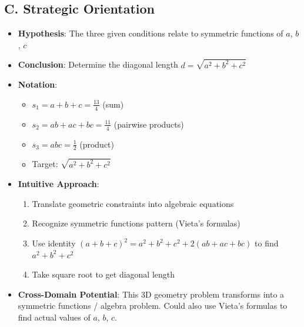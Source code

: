 \documentclass[12pt]{article}
\begin{document}
\begin{problemconfigbox}
\subsection*{C. Strategic Orientation}
\begin{itemize}[leftmargin=*]
    \item \textbf{Hypothesis}: The three given conditions relate to symmetric functions of $a$, $b$, $c$
    \item \textbf{Conclusion}: Determine the diagonal length $d = \sqrt{a^2 + b^2 + c^2}$
    \item \textbf{Notation}: 
    \begin{itemize}
        \item $s_1 = a + b + c = \frac{13}{4}$ (sum)
        \item $s_2 = ab + ac + bc = \frac{11}{4}$ (pairwise products)
        \item $s_3 = abc = \frac{1}{2}$ (product)
        \item Target: $\sqrt{a^2 + b^2 + c^2}$
    \end{itemize}
    \item \textbf{Intuitive Approach}: 
    \begin{enumerate}
        \item Translate geometric constraints into algebraic equations
        \item Recognize symmetric functions pattern (Vieta's formulas)
        \item Use identity $(a+b+c)^2 = a^2+b^2+c^2 + 2(ab+ac+bc)$ to find $a^2+b^2+c^2$
        \item Take square root to get diagonal length
    \end{enumerate}
    \item \textbf{Cross-Domain Potential}: This 3D geometry problem transforms into a symmetric functions / algebra problem. Could also use Vieta's formulas to find actual values of $a$, $b$, $c$.
\end{itemize}
\end{problemconfigbox}
\end{document}
